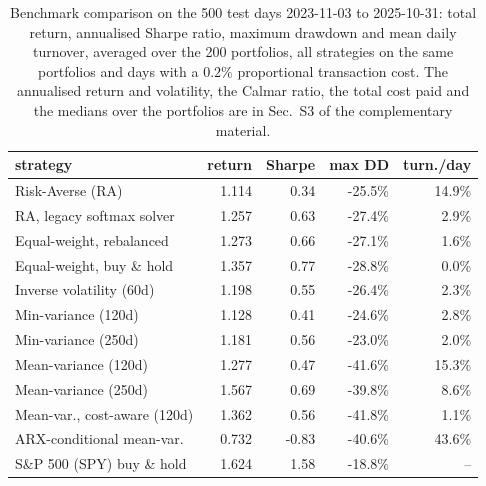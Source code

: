 \begin{table}[ht!]
\centering
\scriptsize
\setlength{\tabcolsep}{3pt}
\begin{tabular}{@{}lrrrr@{}}
\hline
strategy & return & Sharpe & max DD & turn./day \\
\hline
Risk-Averse (RA) & 1.114 & 0.34 & -25.5\% & 14.9\% \\
RA, legacy softmax solver & 1.257 & 0.63 & -27.4\% & 2.9\% \\
Equal-weight, rebalanced & 1.273 & 0.66 & -27.1\% & 1.6\% \\
Equal-weight, buy \& hold & 1.357 & 0.77 & -28.8\% & 0.0\% \\
Inverse volatility (60d) & 1.198 & 0.55 & -26.4\% & 2.3\% \\
Min-variance (120d) & 1.128 & 0.41 & -24.6\% & 2.8\% \\
Min-variance (250d) & 1.181 & 0.56 & -23.0\% & 2.0\% \\
Mean-variance (120d) & 1.277 & 0.47 & -41.6\% & 15.3\% \\
Mean-variance (250d) & 1.567 & 0.69 & -39.8\% & 8.6\% \\
Mean-var., cost-aware (120d) & 1.362 & 0.56 & -41.8\% & 1.1\% \\
ARX-conditional mean-var. & 0.732 & -0.83 & -40.6\% & 43.6\% \\
S\&P 500 (SPY) buy \& hold & 1.624 & 1.58 & -18.8\% & -- \\
\hline
\end{tabular}
\caption{Benchmark comparison on the 500 test days 2023-11-03 to 2025-10-31: total return, annualised Sharpe ratio, maximum drawdown and mean daily turnover, averaged over the 200 portfolios, all strategies on the same portfolios and days with a $0.2\%$ proportional transaction cost. The annualised return and volatility, the Calmar ratio, the total cost paid and the medians over the portfolios are in Sec.~S3 of the complementary material.}
\label{tab:bench_mean}
\end{table}
